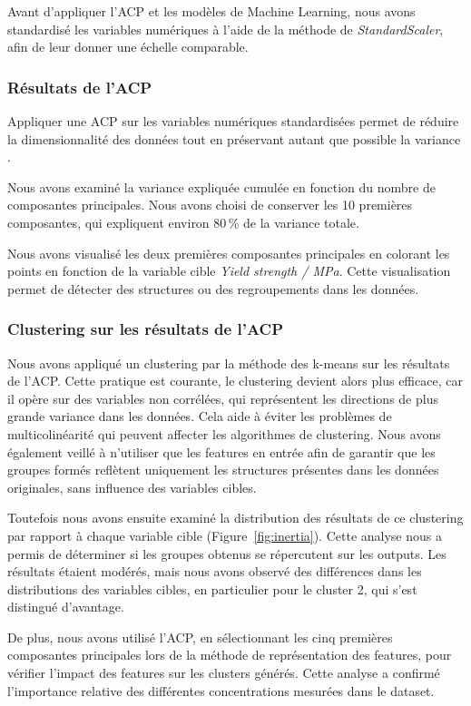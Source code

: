 \documentclass{article}
\newcommand{\bcite}[1]{\textbf{\cite{#1}}}
\begin{document}
Avant d'appliquer l'ACP et les modèles de Machine Learning, nous avons standardisé les variables numériques à l'aide de la méthode de \textit{StandardScaler}, afin de leur donner une échelle comparable.

\subsubsection{Résultats de l'ACP}

Appliquer une ACP sur les variables numériques standardisées permet de réduire la dimensionnalité des données tout en préservant autant que possible la variance \bcite{pca}.

Nous avons examiné la variance expliquée cumulée en fonction du nombre de composantes principales. Nous avons choisi de conserver les 10 premières composantes, qui expliquent environ 80\,\% de la variance totale.

Nous avons visualisé les deux premières composantes principales en colorant les points en fonction de la variable cible \textit{Yield strength / MPa}. Cette visualisation permet de détecter des structures ou des regroupements dans les données.

\subsubsection{Clustering sur les résultats de l'ACP}
Nous avons appliqué un clustering par la méthode des k-means sur les résultats de l'ACP. Cette pratique est courante, le clustering devient alors plus efficace, car il opère sur des variables non corrélées, qui représentent les directions de plus grande variance dans les données. Cela aide à éviter les problèmes de multicolinéarité qui peuvent affecter les algorithmes de clustering. Nous avons également veillé à n'utiliser que les features en entrée afin de garantir que les groupes formés reflètent uniquement les structures présentes dans les données originales, sans influence des variables cibles.

Toutefois nous avons ensuite examiné la distribution des résultats de ce clustering par rapport à chaque variable cible (Figure~\ref{fig:inertia}). Cette analyse nous a permis de déterminer si les groupes obtenus se répercutent sur les outputs. Les résultats étaient modérés, mais nous avons observé des différences dans les distributions des variables cibles, en particulier pour le cluster 2, qui s'est distingué d'avantage.

De plus, nous avons utilisé l'ACP, en sélectionnant les cinq premières composantes principales lors de la méthode de représentation des features, pour vérifier l'impact des features sur les clusters générés. Cette analyse a confirmé l'importance relative des différentes concentrations mesurées dans le dataset. 
\end{document}
